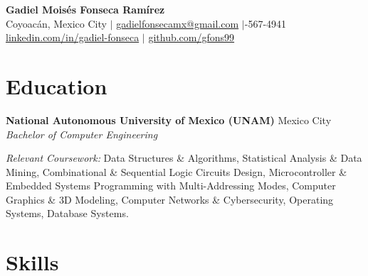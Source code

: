 \documentclass[10pt, letterpaper]{article}
\newcommand{\eduentry}[4]{%
    \textbf{#1} \hfill #3 \\
    \textit{#2} \hfill \textit{#4}
    \vspace{2pt}
}
\begin{document}
\begin{center}
    {\Large\textbf{Gadiel Moisés Fonseca Ramírez}} \\[3pt]
    Coyoacán, Mexico City \enspace$|$\enspace
    \href{mailto:gadielfonsecamx@gmail.com}{\color{linkblue}gadielfonsecamx@gmail.com} \enspace$|$-567-4941 \\[2pt]
    \href{https://www.linkedin.com/in/gadiel-fonseca/}{\color{linkblue}linkedin.com/in/gadiel-fonseca} \enspace$|$\enspace
    \href{https://github.com/gfons99}{\color{linkblue}github.com/gfons99}
\end{center}

\vspace{-4pt}

\section{Education}

\eduentry{National Autonomous University of Mexico (UNAM)}{Bachelor of Computer Engineering}{Mexico City}{}

\textit{Relevant Coursework:} Data Structures \& Algorithms, Statistical Analysis \& Data Mining, Combinational \& Sequential Logic Circuits Design, Microcontroller \& Embedded Systems Programming with Multi-Addressing Modes, Computer Graphics \& 3D Modeling, Computer Networks \& Cybersecurity, Operating Systems, Database Systems.

\section{Skills}
\end{document}
